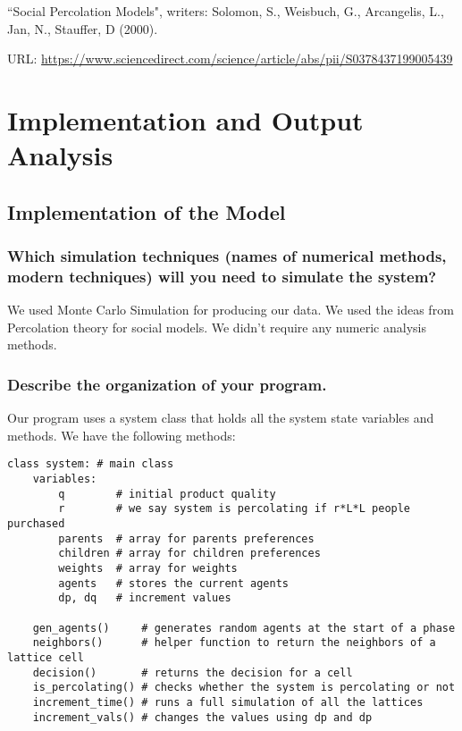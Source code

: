 \documentclass[article, 11pt, a4paper, onesize]{memoir}
\begin{document}
``Social Percolation Models", writers: Solomon, S., Weisbuch, G., Arcangelis, L., Jan, N.,
Stauffer, D (2000).

URL: \url{https://www.sciencedirect.com/science/article/abs/pii/S0378437199005439}



\chapter{Implementation and Output Analysis}

\section{Implementation of the Model}

\subsection{Which simulation techniques (names of numerical methods, modern techniques)
will you need to simulate the system?} 

We used Monte Carlo Simulation for producing our data. We used the ideas from
Percolation theory for social models. We didn't require any numeric analysis
methods.

\subsection{Describe the organization of your program.}

Our program uses a system class that holds all the system state variables and methods. We
have the following methods:

\begin{lstlisting}[style=mypy]
class system: # main class
    variables:
        q        # initial product quality
        r        # we say system is percolating if r*L*L people purchased
        parents  # array for parents preferences
        children # array for children preferences
        weights  # array for weights
        agents   # stores the current agents
        dp, dq   # increment values

    gen_agents()     # generates random agents at the start of a phase
    neighbors()      # helper function to return the neighbors of a lattice cell
    decision()       # returns the decision for a cell
    is_percolating() # checks whether the system is percolating or not
    increment_time() # runs a full simulation of all the lattices
    increment_vals() # changes the values using dp and dp
\end{lstlisting}
\end{document}
